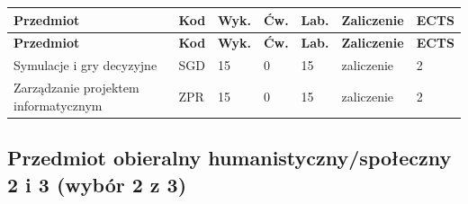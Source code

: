 \documentclass[12pt,a4paper]{article}
\newcommand{\thdrule}{\noalign{\global\setlength{\extrarowheight}{0pt}}}
\newcommand{\thdend}{\noalign{\global\setlength{\extrarowheight}{4pt}}}
\begin{document}
{\scriptsize
\begin{longtable}{m{5.5cm}m{0.8cm}m{1cm}m{1cm}m{1cm}m{1.7cm}m{0.7cm}}
\thdrule\toprule
\rowcolor{pjatkRed}
{\color{white}\footnotesize\textbf{\vphantom{Ag}Przedmiot}} & {\color{white}\footnotesize\textbf{\vphantom{Ag}Kod}} & {\color{white}\footnotesize\textbf{\vphantom{Ag}Wyk.}} & {\color{white}\footnotesize\textbf{\vphantom{Ag}Ćw.}} & {\color{white}\footnotesize\textbf{\vphantom{Ag}Lab.}} & {\color{white}\footnotesize\textbf{\vphantom{Ag}Zaliczenie}} & {\color{white}\footnotesize\textbf{\vphantom{Ag}ECTS}} \\
\midrule\thdend
\endfirsthead
\thdrule\toprule
\rowcolor{pjatkRed}
{\color{white}\footnotesize\textbf{\vphantom{Ag}Przedmiot}} & {\color{white}\footnotesize\textbf{\vphantom{Ag}Kod}} & {\color{white}\footnotesize\textbf{\vphantom{Ag}Wyk.}} & {\color{white}\footnotesize\textbf{\vphantom{Ag}Ćw.}} & {\color{white}\footnotesize\textbf{\vphantom{Ag}Lab.}} & {\color{white}\footnotesize\textbf{\vphantom{Ag}Zaliczenie}} & {\color{white}\footnotesize\textbf{\vphantom{Ag}ECTS}} \\
\midrule\thdend
\endhead
\rowcolor{tableRowLight} Symulacje i gry decyzyjne & SGD & 15 & 0 & 15 & {\scriptsize zaliczenie} & 2 \\
\rowcolor{tableRowAlt} Zarządzanie projektem informatycznym & ZPR & 15 & 0 & 15 & {\scriptsize zaliczenie} & 2 \\
\bottomrule
\end{longtable}}

\subsection*{Przedmiot obieralny humanistyczny/społeczny 2 i 3 (wybór 2 z 3)}
\end{document}
